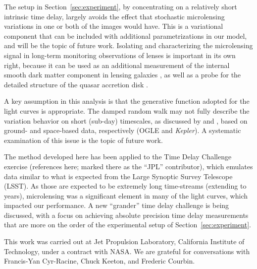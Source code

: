 \documentclass{emulateapj}
\begin{document}
The setup in Section~\ref{sec:experiment}, by concentrating on a
relatively short intrinsic time delay, largely avoids the effect that
stochastic microlensing variations in one or both of the images would
have. This is a variational component that can be included with
additional parametrizations in our model, and will be the topic of
future work. Isolating and characterizing the microlensing signal in
long-term monitoring observations of lenses is important in its own
right, because it can be used as an additional measurement of the
internal smooth dark matter component in lensing galaxies
\citep{Schechter2002a}, as well as a probe for the detailed structure
of the quasar accretion disk \citep[e.g.][]{Morgan2010a}. 

A key assumption in this analysis is that the generative function
adopted for the light curves is appropriate. The damped random walk
may not fully describe the variation behavior on short (sub-day)
timescales, as discussed by \citet{Zu2013a} and
\citet{Mushotzky2011a}, based on ground- and space-based data,
respectively (OGLE and \emph{Kepler}).  A systematic examination of
this issue is the topic of future work. 

The method developed here has been applied to the Time Delay Challenge
exercise (references here; marked there as the ``JPL'' contributor),
which emulates data similar to what is expected from the Large
Synoptic Survey Telescope (LSST).  As those are expected to be
extremely long time-streams (extending to years), microlensing was a
significant element in many of the light curves, which impacted our 
performance. A new ``grander'' time delay challenge is being
discussed, with a focus on achieving absolute precision time delay
measurements that are more on the order of the experimental setup of
Section~\ref{sec:experiment}.

\acknowledgements

This work was carried out at Jet Propulsion Laboratory, California
Institute of Technology, under a contract with NASA.  We are grateful
for conversations with Francis-Yan Cyr-Racine, Chuck Keeton, and
Frederic Courbin. 




\end{document}
